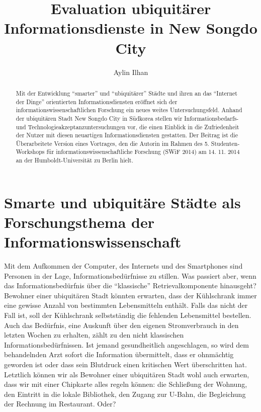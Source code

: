 \documentclass[a4paper,
fontsize=11pt,
oneside,
numbers=noperiodatend,
parskip=half-,
bibliography=totoc,
final
]{scrartcl}
\title{\LARGE{Evaluation ubiquitärer Informationsdienste in New Songdo City}} %
\author{Aylin Ilhan} %
\date{}
\begin{document}
\maketitle
\thispagestyle{fancyplain} 

\begin{abstract}
Mit der Entwicklung ``smarter'' und ``ubiquitärer'' Städte und ihren an
das ``Internet der Dinge'' orientierten Informationsdiensten eröffnet
sich der informationswissenschaftlichen Forschung ein neues weites
Untersuchungsfeld. Anhand der ubiquitären Stadt New Songdo City in
Südkorea stellen wir Informationsbedarfs- und
Technologieakzeptanzuntersuchungen vor, die einen Einblick in die
Zufriedenheit der Nutzer mit diesen neuartigen Informationsdiensten
gestatten. Der Beitrag ist die Überarbeitete Version eines Vortrages,
den die Autorin im Rahmen des 5. Studenten-Workshops für
informationswissenschaftliche Forschung (SWiF 2014) am 14. 11. 2014 an
der Humboldt-Universität zu Berlin hielt.
\end{abstract}

\section*{Smarte und ubiquitäre Städte als Forschungsthema der
Informationswissenschaft}\label{smarte-und-ubiquituxe4re-stuxe4dte-als-forschungsthema-der-informationswissenschaft}

Mit dem Aufkommen der Computer, des Internets und des Smartphones sind
Personen in der Lage, Informationsbedürfnisse zu stillen. Was passiert
aber, wenn das Informationsbedürfnis über die \enquote{klassische}
Retrievalkomponente hinausgeht? Bewohner einer ubiquitären Stadt könnten
erwarten, dass der Kühlschrank immer eine gewisse Anzahl von bestimmten
Lebensmitteln enthält. Falls das nicht der Fall ist, soll der
Kühlschrank selbstständig die fehlenden Lebensmittel bestellen. Auch das
Bedürfnis, eine Auskunft über den eigenen Stromverbrauch in den letzten
Wochen zu erhalten, zählt zu den nicht klassischen
Informationsbedürfnissen. Ist jemand gesundheitlich angeschlagen, so
wird dem behandelnden Arzt sofort die Information übermittelt, dass er
ohnmächtig geworden ist oder dass sein Blutdruck einen kritischen Wert
überschritten hat. Letztlich können wir als Bewohner einer ubiquitären
Stadt wohl auch erwarten, dass wir mit einer Chipkarte alles regeln
können: die Schließung der Wohnung, den Eintritt in die lokale
Bibliothek, den Zugang zur U-Bahn, die Begleichung der Rechnung im
Restaurant. Oder?
\end{document}
